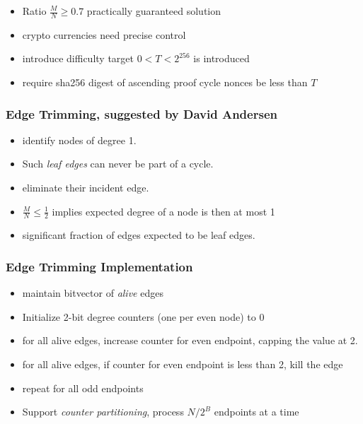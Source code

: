 \documentclass{beamer}
\begin{document}

\begin{frame}
\begin{itemize}
\frametitle{Difficulty control}
\item 
Ratio $\frac{M}{N} \geq 0.7$ practically guaranteed solution
\item
crypto currencies need precise control


\item
introduce difficulty target $0 < T < 2^{256}$ is introduced
\item
require sha256 digest of ascending proof cycle nonces be less than $T$
\end{itemize}
\end{frame}

\begin{frame}
\frametitle{Edge Trimming, suggested by David Andersen}
\begin{itemize}
\item
identify nodes of degree 1.
\item 
Such {\em leaf edges} can never be part of a cycle.
\item
eliminate their incident edge.
\item $\frac{M}{N} \leq \frac{1}{2}$ implies expected degree of a node is then at most 1
\item
significant fraction of edges expected to be leaf edges.
\end{itemize}
\end{frame}

\begin{frame}
\frametitle{Edge Trimming Implementation}
\begin{itemize}
\item
maintain bitvector of {\em alive} edges
\item
Initialize 2-bit degree counters (one per even node) to 0
\item
for all alive edges, increase counter for even endpoint,
capping the value at 2.
\item
for all alive edges, if counter for even endpoint is less than 2,
kill the edge
\item repeat for all odd endpoints
\item 
Support {\em counter partitioning}, process $N / 2^{B}$ endpoints at a time
\end{itemize}
\end{frame}
\end{document}
